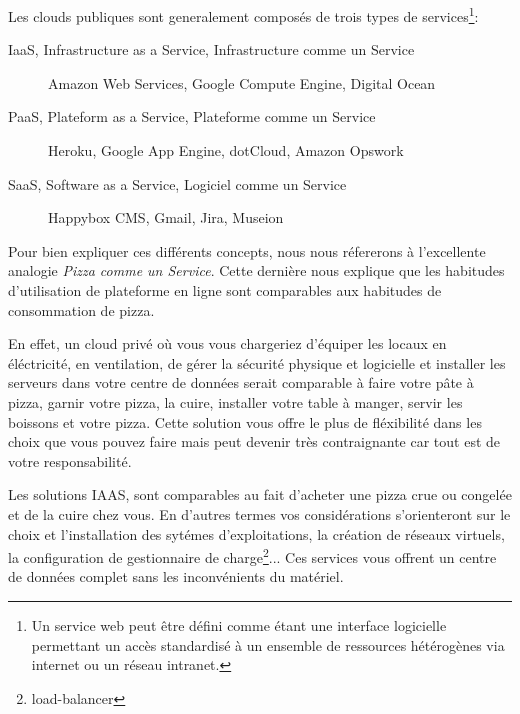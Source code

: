 \documentclass[11pt, a4paper ]{article}
\begin{document}
Les clouds publiques sont generalement composés de trois types de services\footnote{Un service web\cite{webServicesDef} peut être défini comme étant une interface logicielle permettant un accès standardisé à un ensemble de ressources hétérogènes via internet ou un réseau intranet.}:
\begin{description}

	\item[IaaS, Infrastructure as a Service, Infrastructure comme un Service] Amazon Web Services, Google Compute Engine, Digital Ocean

	\item[PaaS, Plateform as a Service, Plateforme comme un Service] Heroku, Google App Engine, dotCloud, Amazon Opswork

	\item[SaaS, Software as a Service, Logiciel comme un Service]
	Happybox CMS, Gmail, Jira, Museion

\end{description}

Pour bien expliquer ces différents concepts, nous nous réfererons à l'excellente analogie \emph{Pizza comme un Service}\cite{PizzaasaService}. Cette dernière nous explique que les habitudes d'utilisation de plateforme en ligne sont comparables aux habitudes de consommation de pizza.

En effet, un cloud privé où vous vous chargeriez d'équiper les locaux en éléctricité, en ventilation, de gérer la sécurité physique et logicielle et installer les serveurs dans votre centre de données serait comparable à faire votre pâte à pizza, garnir votre pizza, la cuire, installer votre table à manger, servir les boissons et votre pizza. Cette solution vous offre le plus de fléxibilité dans les choix que vous pouvez faire mais peut devenir très contraignante car tout est de votre responsabilité.

Les solutions IAAS, sont comparables au fait d'acheter une pizza crue ou congelée et de la cuire chez vous. En d'autres termes vos considérations s'orienteront sur le choix et l'installation des sytémes d'exploitations, la création de réseaux virtuels, la configuration de gestionnaire de charge\footnote{load-balancer}... Ces services vous offrent un centre de données complet sans les inconvénients du matériel.
\end{document}
